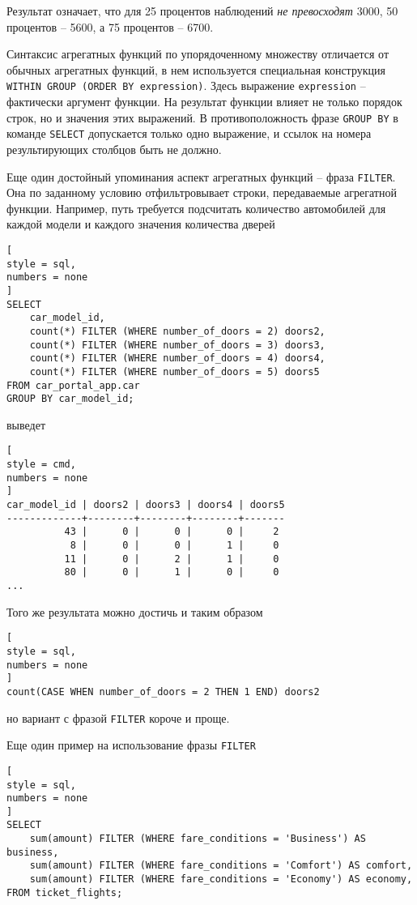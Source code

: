 \documentclass[%
	11pt,
	a4paper,
	utf8,
		]{article}
\begin{document}
Результат означает, что для 25 процентов наблюдений \emph{не превосходят} 3000, 50 процентов -- 5600, а 75 процентов -- 6700.

Синтаксис агрегатных функций по упорядоченному множеству отличается от обычных агрегатных функций, в нем используется специальная конструкция \texttt{WITHIN GROUP (ORDER BY expression)}. Здесь выражение \texttt{expression} -- фактически аргумент функции. На результат функции влияет не только порядок строк, но и значения этих выражений. В противоположность фразе \texttt{GROUP BY} в команде \texttt{SELECT} допускается только одно выражение, и ссылок на номера результирующих столбцов быть не должно.

Еще один достойный упоминания аспект агрегатных функций -- фраза \texttt{FILTER}. Она по заданному условию отфильтровывает строки, передаваемые агрегатной функции. Например, путь требуется подсчитать количество автомобилей для каждой модели и каждого значения количества дверей
\begin{lstlisting}[
style = sql,
numbers = none
]
SELECT
    car_model_id,
    count(*) FILTER (WHERE number_of_doors = 2) doors2,
    count(*) FILTER (WHERE number_of_doors = 3) doors3,
    count(*) FILTER (WHERE number_of_doors = 4) doors4,
    count(*) FILTER (WHERE number_of_doors = 5) doors5
FROM car_portal_app.car
GROUP BY car_model_id;
\end{lstlisting}
выведет
\begin{lstlisting}[
style = cmd,
numbers = none
]
car_model_id | doors2 | doors3 | doors4 | doors5
-------------+--------+--------+--------+-------
          43 |      0 |      0 |      0 |     2
           8 |      0 |      0 |      1 |     0
          11 |      0 |      2 |      1 |     0
          80 |      0 |      1 |      0 |     0
...
\end{lstlisting}

Того же результата можно достичь и таким образом
\begin{lstlisting}[
style = sql,
numbers = none
]
count(CASE WHEN number_of_doors = 2 THEN 1 END) doors2
\end{lstlisting}
но вариант с фразой \texttt{FILTER} короче и проще.

Еще один пример на использование фразы \texttt{FILTER}
\begin{lstlisting}[
style = sql,
numbers = none
]
SELECT
    sum(amount) FILTER (WHERE fare_conditions = 'Business') AS business,
    sum(amount) FILTER (WHERE fare_conditions = 'Comfort') AS comfort,
    sum(amount) FILTER (WHERE fare_conditions = 'Economy') AS economy,
FROM ticket_flights;
\end{lstlisting}
\end{document}
